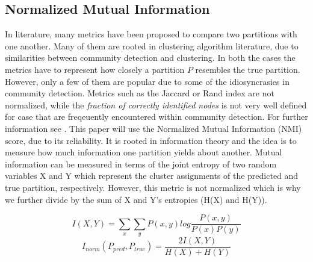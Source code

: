\documentclass[11pt, twocolumn]{article}
\begin{document}
\subsection{Normalized Mutual Information} 
In literature, many metrics have been proposed to compare two partitions with one another. Many of them are rooted in clustering algorithm literature, due to similarities between community detection and clustering. In both the cases the metrics have to represent how closely a partition $P$ resembles the true partition. However, only a few of them are popular due to some of the idiosyncrasies in community detection. Metrics such as the Jaccard or Rand index are not normalized, while the \emph{fraction of correctly identified nodes} is not very well defined for case that are freqeuently encountered within community detection. For further information see \citeauthor{fortunato_CommunityDetectionNetworks_2016}. This paper will use the Normalized Mutual Information (NMI) score, due to its reliability. It is rooted in information theory and the idea is to measure how much information one partition yields about another. Mutual information can be measured in terms of the joint entropy of two random variables X and Y which represent the cluster assignments of the predicted and true partition, respectively. However, this metric is not normalized which is why we further divide by the sum of X and Y's entropies (H(X) and H(Y)). 

\begin{equation}
I(X,Y) = \sum_x\sum_y P(x,y) log\frac{P(x,y)}{P(x)P(y)}
\end{equation}
\begin{equation}
I_{norm}(P_{pred},P_{true}) = \frac{2I(X,Y)}{H(X) + H(Y)}
\end{equation}
\end{document}
